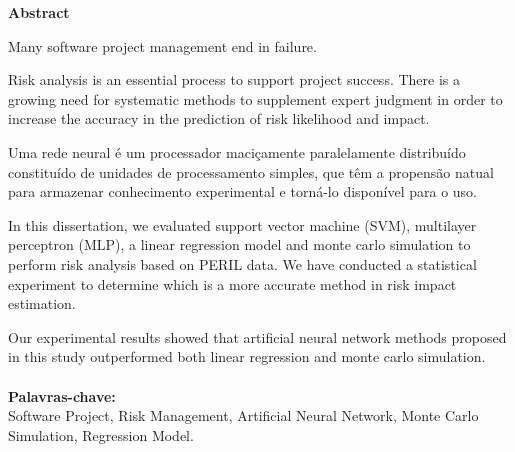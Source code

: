 \begin{flushbottom}
\begin{flushleft}
{\huge \textbf{Abstract}}
\linebreak
\end{flushleft}
Many software project management end in failure. 

Risk analysis is an essential process to support project success. There is a growing need for systematic methods to supplement expert judgment in order to increase the accuracy in the prediction of risk likelihood and impact. 

Uma rede neural é um processador maciçamente paralelamente distribuído constituído de unidades de processamento simples, que têm a propensão natual para armazenar conhecimento experimental e torná-lo disponível para o uso.

In this dissertation, we evaluated support vector machine (SVM), multilayer perceptron (MLP), a linear regression model and monte carlo simulation to perform risk analysis based on PERIL data. We have conducted a statistical experiment to determine which is a more accurate method in risk impact estimation. 

Our experimental results showed that artificial neural network methods proposed in this study outperformed both linear regression and monte carlo simulation.
\\
\\
\textbf{Palavras-chave:} \\ Software Project, Risk Management, Artificial Neural Network, Monte Carlo Simulation, Regression Model.\end{flushbottom}
\newpage
